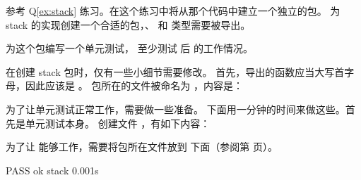 \begin{Exercise}[title={stack 包},difficulty=2]
\label{ex:stack-package}
\Question\label{ex:stack-package q1} 
参考 Q\ref{ex:stack} 练习。在这个练习中将从那个代码中建立一个独立的包。
为 stack 的实现创建一个合适的包，、 和  类型需要被导出。

\Question\label{ex:stack-package q2} 为这个包编写一个单元测试，
至少测试  后  的工作情况。

\end{Exercise}

\begin{Answer}
\Question 在创建 stack 包时，仅有一些小细节需要修改。
首先，导出的函数应当大写首字母，因此应该是 。
包所在的文件被命名为 ，内容是：


\Question 为了让单元测试正常工作，需要做一些准备。
下面用一分钟的时间来做这些。首先是单元测试本身。
创建文件 ，有如下内容：

为了让  能够工作，需要将包所在文件放到 
 下面（参阅第 \pageref{"sec:settings used"} 页）。


\begin{display}
\pr {}
\pr {}
\pr {}
\end{display}

\begin{display}
\pr {}
PASS
ok      stack   0.001s
\end{display}
\end{Answer}

